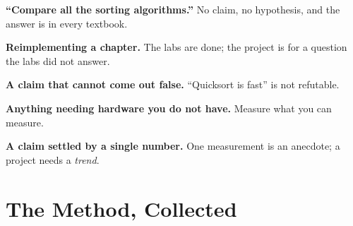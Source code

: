 \begin{alertbox}
\begin{tight}
  \item \textbf{``Compare all the sorting algorithms.''} No claim, no
        hypothesis, and the answer is in every textbook.
  \item \textbf{Reimplementing a chapter.} The labs are done; the project is
        for a question the labs did not answer.
  \item \textbf{A claim that cannot come out false.} ``Quicksort is fast'' is
        not refutable.
  \item \textbf{Anything needing hardware you do not have.} Measure what you can
        measure.
  \item \textbf{A claim settled by a single number.} One measurement is an
        anecdote; a project needs a \emph{trend}.
\end{tight}
\end{alertbox}

\section{The Method, Collected}

